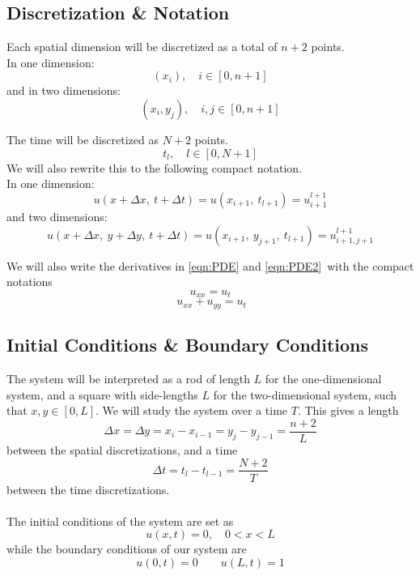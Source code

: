 \documentclass[10pt,a4paper]{article}
\newcommand{\dt}{{\Delta t}}
\newcommand{\dx}{{\Delta x}}
\newcommand{\dy}{{\Delta y}}
\begin{document}
\subsection{Discretization \& Notation}\label{sec:disc}
Each spatial dimension will be discretized as a total of $n+2$ points.\\
In one dimension:
\begin{equation} (x_i), \quad i \in [0,n+1] \end{equation}
and in two dimensions:
\begin{equation} (x_i, y_j), \quad i,j \in [0,n+1]\end{equation}

The time will be discretized as $N+2$ points.
\begin{equation} t_l, \quad l \in [0,N+1] \end{equation}
We will also rewrite this to the following compact notation.\\
In one dimension:
\begin{equation}
u(x+\dx,\ t+\dt) = u(x_{i+1},\ t_{l+1}) = u_{i+1}^{l+1}
\end{equation}
and two dimensions:
\begin{equation}
u(x+\dx,\ y+\dy,\ t+\dt) = u(x_{i+1},\ y_{j+1},\ t_{l+1}) = u_{i+1,j+1}^{l+1}
\end{equation}


We will also write the derivatives in \ref{eqn:PDE} and \ref{eqn:PDE2} with the compact notations
\begin{equation} u_{xx} = u_t\end{equation}
\begin{equation} \ u_{xx} + u_{yy} = u_t \end{equation}


\subsection{Initial Conditions \& Boundary Conditions}
The system will be interpreted as a rod of length $L$ for the one-dimensional system, and a square with side-lengths $L$ for the two-dimensional system, such that $x,y \in [0,L]$. We will study the system over a time $T$. This gives a length
\begin{equation}
\dx = \dy = x_i - x_{i-1} = y_j - y_{j-1} = \frac{n+2}{L}
\end{equation}
between the spatial discretizations, and a time
\begin{equation}
\dt = t_l - t_{l-1} = \frac{N+2}{T}
\end{equation}
between the time discretizations.\\\\
The initial conditions of the system are set as
\begin{equation}
u(x,t) = 0, \quad 0 < x < L
\end{equation}
while the boundary conditions of our system are
\begin{equation}
u(0,t) = 0 \quad \quad u(L,t) = 1
\end{equation}
\end{document}
